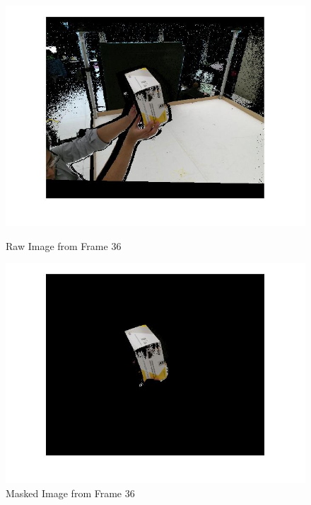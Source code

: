 \documentclass[10pt,a4paper]{article}
\begin{document}
\vspace{-10pt}
\hspace{-40pt}
\begin{figure}[!h]
\hspace{-50pt}
\begin{minipage}[t]{0.74 \linewidth}
	
	\centering
	\includegraphics[scale=0.3]{unmasked.jpg}
	\caption{ \small Raw Image from Frame 36}
    \label{fig:23}
\end{minipage}
\hspace{-100pt}
\begin{minipage}[t]{0.74 \linewidth}
	\centering
	\includegraphics[scale=0.3]{masked.jpg}
	\caption{ \small Masked Image from Frame 36}
    \label{fig:24}
\end{minipage}
\end{figure}
\end{document}
